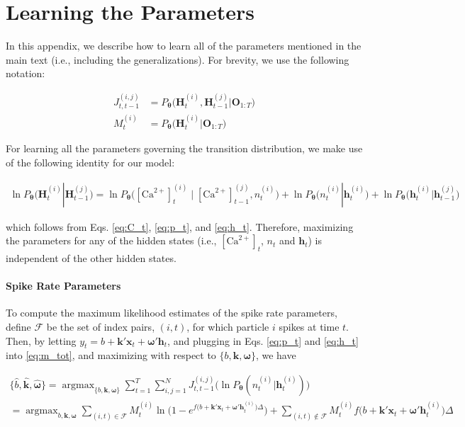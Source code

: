 \documentclass[12pt]{article}
\providecommand{\ve}[1]{\boldsymbol{#1}}
\providecommand{\ve}[1]{\boldsymbol{#1}}
\DeclareMathOperator*{\argmax}{argmax}
\newcommand{\thetn}{\ve{\theta}}
\newcommand{\p}{P_{\thetn}}
\newcommand{\Ca}{[\text{Ca}^{2+}]}
\begin{document}
\section{Learning the Parameters} \label{sec:mstep}

In this appendix, we describe how to learn all of the parameters mentioned in the main text (i.e., including the generalizations).  For brevity, we use the following notation:

\begin{align*}
J_{t,t-1}^{(i,j)} &= \p\big(\ve{H}_t^{(i)}, \ve{H}_{t-1}^{(j)} | \ve{O}_{1:T}\big) \\
M_{t}^{(i)} &= \p\big(\ve{H}_t^{(i)} | \ve{O}_{1:T}\big) 
\end{align*}

\noindent For learning all the parameters governing the transition distribution, we make use of the following identity for our model:

\begin{multline}
\ln \p\big(\ve{H}_t^{(i)} | \ve{H}_{t-1}^{(j)}\big) =
\ln \p\big(\Ca_t^{(i)} \mid \Ca_{t-1}^{(j)}, n_t^{(i)}\big) + \ln \p\big(n_t^{(i)} | \ve{h}_t^{(i)}\big) + \ln \p\big(\ve{h}_t^{(i)} | \ve{h}_{t-1}^{(j)}\big)
\end{multline}

\noindent which follows from Eqs. \ref{eq:C_t}, \ref{eq:p_t}, and \ref{eq:h_t}. Therefore, maximizing the parameters for any of the hidden states (i.e., $\Ca_t$, $n_t$ and $\ve{h}_t$) is independent of the other hidden states. 

\paragraph{Spike Rate Parameters} 

To compute the maximum likelihood estimates of the spike rate parameters, define $\mathcal{F}$ be the set of index pairs, $(i,t)$, for which particle $i$ spikes at time $t$.  Then, by letting $y_t=b+\ve{k}' \ve{x}_t+ \ve{\omega}' \ve{h}_t$, and plugging in Eqs. \ref{eq:p_t} and \ref{eq:h_t} into \ref{eq:m_tot}, and maximizing with respect to $\{b, \ve{k}, \ve{\omega}\}$, we have

\begin{multline} \label{eq:spike_params}
\{\widehat{b},\widehat{\ve{k}},\widehat{\ve{\omega}}\} = \argmax_{\{b, \ve{k}, \ve{\omega}\}} \sum_{t=1}^T \sum_{i,j=1}^N J^{(i,j)}_{t,t-1}  \big( \ln \p (n_t^{(i)} | \ve{h}_t^{(i)})\big)
\\=\argmax_{b,\ve{k},\ve{\omega}} \sum_{(i,t) \in \mathcal{F}} M^{(i)}_t \ln \bigg(1-e^{f\big(b+\ve{k}' \ve{x}_t+\ve{\omega}' \ve{h}_t^{(i)}\big) \Delta}\bigg) + \sum_{(i,t) \notin \mathcal{F}} M^{(i)}_t f\big(b + \ve{k}' \ve{x}_t +\ve{\omega}' \ve{h}_t^{(i)}\big) \Delta
\end{multline}
\end{document}
